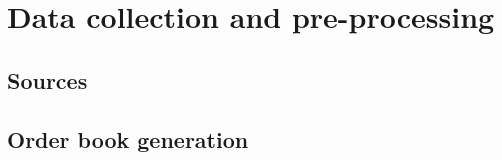 \chapter{Data collection and pre-processing}
\label{chap:data}

\section{Sources}

\section{Order book generation}

